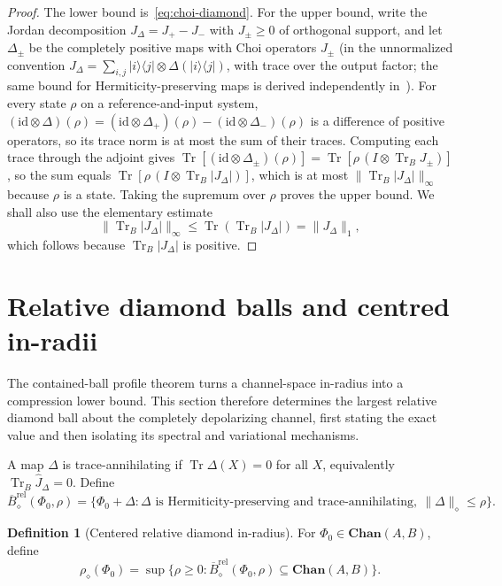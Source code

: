 \documentclass[11pt,a4paper]{article}
\theoremstyle{definition}
\newtheorem{definition}{Definition}[section]
\theoremstyle{plain}
\theoremstyle{remark}
\DeclareMathOperator{\Tr}{Tr}
\newcommand{\Chan}{\mathbf{Chan}}
\newcommand{\id}{\mathrm{id}}
\begin{document}
\begin{proof}
The lower bound is~\eqref{eq:choi-diamond}. For the upper bound, write the Jordan decomposition $J_\Delta=J_+-J_-$ with
$J_\pm\geq0$ of orthogonal support, and let $\Delta_\pm$ be the completely
positive maps with Choi operators $J_\pm$ (in the unnormalized convention
$J_\Delta=\sum_{i,j}|i\rangle\langle j|\otimes\Delta(|i\rangle\langle j|)$,
with trace over the output factor; the same bound for Hermiticity-preserving
maps is derived independently in~\cite[Corollary~2]{NechitaEtAl2018}).
For every state $\rho$ on a reference-and-input system,
$(\id\otimes\Delta)(\rho)=(\id\otimes\Delta_+)(\rho)-(\id\otimes\Delta_-)(\rho)$
is a difference of positive operators, so its trace norm is at most the sum
of their traces. Computing each trace through the adjoint gives
$\Tr[(\id\otimes\Delta_\pm)(\rho)]=\Tr[\rho\,(I\otimes\Tr_BJ_\pm)]$, so the
sum equals $\Tr[\rho\,(I\otimes\Tr_B|J_\Delta|)]$, which is at most
$\|\Tr_B|J_\Delta|\|_\infty$ because $\rho$ is a state. Taking the supremum
over $\rho$ proves the upper bound. We shall also use the elementary estimate
\[
\|\Tr_B|J_\Delta|\|_\infty
\leq\Tr(\Tr_B|J_\Delta|)
=\|J_\Delta\|_1,
\]
which follows because $\Tr_B|J_\Delta|$ is positive.
\end{proof}


\section{Relative diamond balls and centred in-radii}
\label{sec:balls}

The contained-ball profile theorem turns a channel-space in-radius into a
compression lower bound. This section therefore determines the largest
relative diamond ball about the completely depolarizing channel, first
stating the exact value and then isolating its spectral and variational
mechanisms.

A map $\Delta$ is trace-annihilating if $\Tr\Delta(X)=0$ for all $X$,
equivalently $\Tr_B\widehat J_\Delta=0$. Define
\[
\overline B^{\mathrm{rel}}_\diamond(\Phi_0,\rho)
=\{\Phi_0+\Delta:\Delta\text{ is Hermiticity-preserving and
trace-annihilating},\ \|\Delta\|_\diamond\leq\rho\}.
\]

\begin{definition}[Centered relative diamond in-radius]
For $\Phi_0\in\Chan(A,B)$, define
\[
\rho_\diamond(\Phi_0)
=\sup\{\rho\geq0:
\overline B^{\mathrm{rel}}_\diamond(\Phi_0,\rho)
\subseteq\Chan(A,B)\}.
\]
\end{definition}
\end{document}
